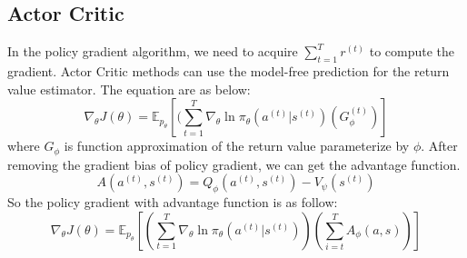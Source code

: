 \documentclass[11pt]{article}
\begin{document}
\subsection{Actor Critic}
\label{ACM}

In the policy gradient algorithm, we need to acquire $\sum_{t=1}^T r^{(t)}$ to compute the gradient. Actor Critic methods can use the model-free prediction for the return value estimator. The equation are as below:
$$\nabla_\theta J(\theta) = \mathbb{E}_{p_\theta} [(\sum_{t=1}^T \nabla_\theta \ln \pi_\theta (a^{(t)} | s^{(t)}) (G_\phi^{(t)}) ]$$
where $G_\phi$ is function approximation of the return value parameterize by $\phi$. After removing the gradient bias of policy gradient, we can get the advantage function.
$$A(a^{(t)}, s^{(t)}) = Q_\phi (a^{(t)}, s^{(t)}) - V_\psi (s^{(t)})$$
So the policy gradient with advantage function is as follow:
$$\nabla_\theta J(\theta) = \mathbb{E}_{p_\theta} [(\sum_{t=1}^T \nabla_\theta \ln \pi_\theta (a^{(t)} | s^{(t)}))(\sum_{i=t}^T A_\phi (a, s))]$$
\end{document}
